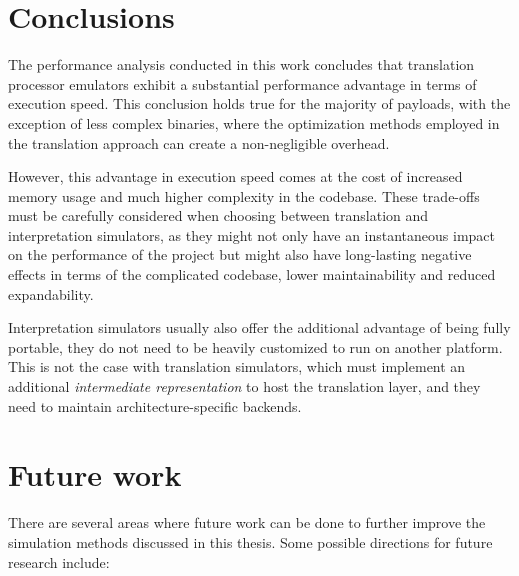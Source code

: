 \pagebreak

\section{Conclusions}

The performance analysis conducted in this work concludes that translation processor emulators exhibit a substantial
performance advantage in terms of execution speed. This conclusion holds true for the majority of payloads, with the
exception of less complex binaries, where the optimization methods employed in the translation approach can create a
non-negligible overhead.

However, this advantage in execution speed comes at the cost of increased memory usage and much higher complexity in
the codebase. These trade-offs must be carefully considered when choosing between translation and interpretation
simulators, as they might not only have an instantaneous impact on the performance of the project but might also
have long-lasting negative effects in terms of the complicated codebase, lower maintainability and reduced
expandability.

Interpretation simulators usually also offer the additional advantage of being fully portable, they do not need
to be heavily customized to run on another platform. This is not the case with translation simulators, which must
implement an additional \textit{intermediate representation} to host the translation layer, and they need to maintain architecture-specific backends.

\section{Future work}

There are several areas where future work can be done to further improve the simulation methods discussed in this
thesis. Some possible directions for future research include:

